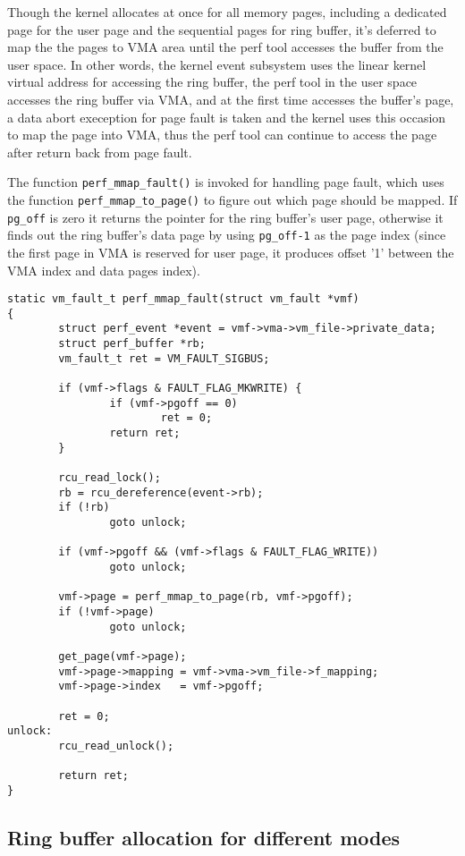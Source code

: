 \documentclass[11pt]{diazessay} %
\def\code#1{\texttt{#1}}
\begin{document}
Though the kernel allocates at once for all memory pages, including a dedicated page for the user page and the sequential pages for ring buffer, it's deferred to map the the pages to VMA area until the perf tool accesses the buffer from the user space.  In other words, the kernel event subsystem uses the linear kernel virtual address for accessing the ring buffer, the perf tool in the user space accesses the ring buffer via VMA, and at the first time accesses the buffer's page, a data abort exeception for page fault is taken and the kernel uses this occasion to map the page into VMA, thus the perf tool can continue to access the page after return back from page fault.

The function \code{perf\_mmap\_fault()} is invoked for handling page fault, which uses the function \code{perf\_mmap\_to\_page()} to figure out which page should be mapped. If \code{pg\_off} is zero it returns the pointer for the ring buffer's user page, otherwise it finds out the ring buffer's data page by using \code{pg\_off-1} as the page index (since the first page in VMA is reserved for user page, it produces offset '1' between the VMA index and data pages index).

\begin{lstlisting}
static vm_fault_t perf_mmap_fault(struct vm_fault *vmf)
{
        struct perf_event *event = vmf->vma->vm_file->private_data;
        struct perf_buffer *rb;
        vm_fault_t ret = VM_FAULT_SIGBUS;

        if (vmf->flags & FAULT_FLAG_MKWRITE) {
                if (vmf->pgoff == 0)
                        ret = 0;
                return ret;
        }

        rcu_read_lock();
        rb = rcu_dereference(event->rb);
        if (!rb)
                goto unlock;

        if (vmf->pgoff && (vmf->flags & FAULT_FLAG_WRITE))
                goto unlock;

        vmf->page = perf_mmap_to_page(rb, vmf->pgoff);
        if (!vmf->page)
                goto unlock;

        get_page(vmf->page);
        vmf->page->mapping = vmf->vma->vm_file->f_mapping;
        vmf->page->index   = vmf->pgoff;

        ret = 0;
unlock:
        rcu_read_unlock();

        return ret;
}
\end{lstlisting}

\subsection*{Ring buffer allocation for different modes}
\end{document}
